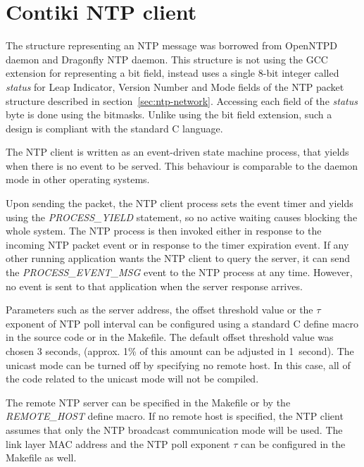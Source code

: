 
\section{Contiki NTP client}
The structure representing an NTP message was borrowed from OpenNTPD daemon
and Dragonfly NTP daemon.
This structure is not using the GCC extension for representing a bit field,
instead uses a single 8-bit integer called {\it{status}}
for Leap Indicator, Version Number and Mode fields of the NTP packet
structure described in section~\ref{sec:ntp-network}.
Accessing each field of the {\it{status}} byte is done using the bitmasks.
Unlike using the bit field extension,
such a design is compliant with the standard C language.

The NTP client is written as an event-driven state machine process,
that yields when there is no event to be served.
This behaviour is comparable to the daemon mode in other operating systems.

Upon sending the packet, the NTP client process sets the event timer and yields
using the {\it{PROCESS\_YIELD}} statement,
so no active waiting causes blocking the whole system.
The NTP process is then invoked either in response to the incoming NTP packet event
or in response to the timer expiration event.
If any other running application wants the NTP client to query the server,
it can send the {\it{PROCESS\_EVENT\_MSG}} event to the NTP process at any time.
However, no event is sent to that application when the server response arrives.

Parameters such as the server address, the offset threshold value
or the $\tau$ exponent of NTP poll interval can be configured using a standard C define macro
in the source code or in the Makefile.
The default offset threshold value was chosen 3 seconds,
(approx. 1\% of this amount can be adjusted in 1~second).
The unicast mode can be turned off by specifying no remote host.
In this case, all of the code related to the unicast mode will not be compiled.

The remote NTP server can be specified in the Makefile or
by the {\it{REMOTE\_HOST}} define macro.
If no remote host is specified, the NTP client assumes that only the NTP broadcast communication mode will be used.
The link layer MAC address and the NTP poll exponent $\tau$
can be configured in the Makefile as well.

